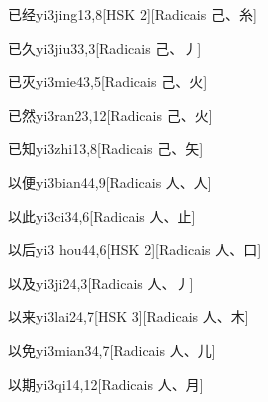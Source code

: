 \begin{entry}{已经}{yi3jing1}{3,8}[HSK 2][Radicais ⼰、⽷]
\end{entry}

\begin{entry}{已久}{yi3jiu3}{3,3}[Radicais ⼰、⼃]
\end{entry}

\begin{entry}{已灭}{yi3mie4}{3,5}[Radicais ⼰、⽕]
\end{entry}

\begin{entry}{已然}{yi3ran2}{3,12}[Radicais ⼰、⽕]
\end{entry}

\begin{entry}{已知}{yi3zhi1}{3,8}[Radicais ⼰、⽮]
\end{entry}

\begin{entry}{以便}{yi3bian4}{4,9}[Radicais ⼈、⼈]
\end{entry}

\begin{entry}{以此}{yi3ci3}{4,6}[Radicais ⼈、⽌]
\end{entry}

\begin{entry}{以后}{yi3 hou4}{4,6}[HSK 2][Radicais ⼈、⼝]
\end{entry}

\begin{entry}{以及}{yi3ji2}{4,3}[Radicais ⼈、⼃]
\end{entry}

\begin{entry}{以来}{yi3lai2}{4,7}[HSK 3][Radicais ⼈、⽊]
\end{entry}

\begin{entry}{以免}{yi3mian3}{4,7}[Radicais ⼈、⼉]
\end{entry}

\begin{entry}{以期}{yi3qi1}{4,12}[Radicais ⼈、⽉]
\end{entry}

